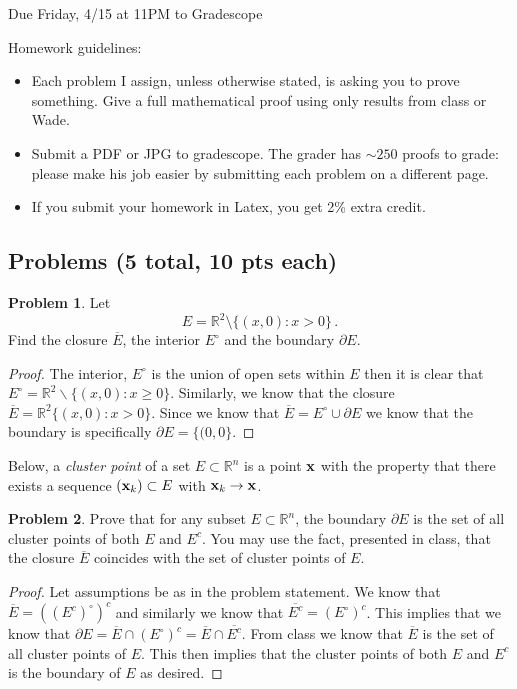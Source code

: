\documentclass[11pt]{article}
\theoremstyle{definition}
\newtheorem{problem}{Problem}
\newcommand{\R}{\mathbb{R}}
\newcommand{\bx}{{\bf x}}
\begin{document}
  \hfill Due Friday, 4/15 at 11PM to Gradescope

\bigskip

\noindent Homework guidelines: 
\begin{itemize}
\item Each problem I assign, unless otherwise stated, is asking you to prove something. Give a full mathematical proof using only results from class or Wade.
\item Submit a PDF or JPG to gradescope. The grader has $\sim 250$ proofs to grade:  please make his job easier by submitting each problem on a different page. 
\item If you submit your homework in Latex, you get 2\% extra credit. 
\end{itemize}


\subsection*{Problems (5 total, 10 pts each)}

\begin{problem}
Let 
\[
E = \R^2 \setminus \{ (x,0) : x > 0\} \,. 
\]
Find the closure $\overline{E}$, the interior $E^\circ$ and the boundary $\partial E$. 
\end{problem}

\begin{proof}
The interior, $E^\circ$ is the union of open sets within $E$ then it is clear that $E^\circ = \R^2\backslash \{(x, 0): x \geq 0\}$. Similarly, we know that the closure $\overline{E} = \R^2 \{(x, 0): x > 0\}$. Since we know that $\overline{E} = E^\circ\cup\partial E$ we know that the boundary is specifically $\partial E = \{(0, 0\}.$
\end{proof}

\pagebreak
Below, a \emph{cluster point} of a set $E \subset \R^n$ is a point $\bx$ with the 
property that there exists a sequence $(\bx_k) \subset E$ with $\bx_k \to \bx$. 
\begin{problem}
Prove that for any subset $E \subset \R^n$, the boundary $\partial E$ is the set of all cluster points of both $E$ and $E^c$. You may use the fact, presented in class, that the closure $\overline E$ coincides with the set of cluster points of $E$. 
\end{problem}

\begin{proof}
Let assumptions be as in the problem statement. We know that $\overline E = ((E^c)^\circ)^c$ and similarly we know that $\overline{E^c} = (E^\circ)^c$. This implies that we know that $\partial E = \overline{E}\cap (E^\circ)^c = \overline{E}\cap \overline{E^c}$. From class we know that $\overline{E}$ is the set of all cluster points of $E$. This then implies that the cluster points of both $E$ and $E^c$ is the boundary of $E$ as desired. 
\end{proof}
\end{document}
